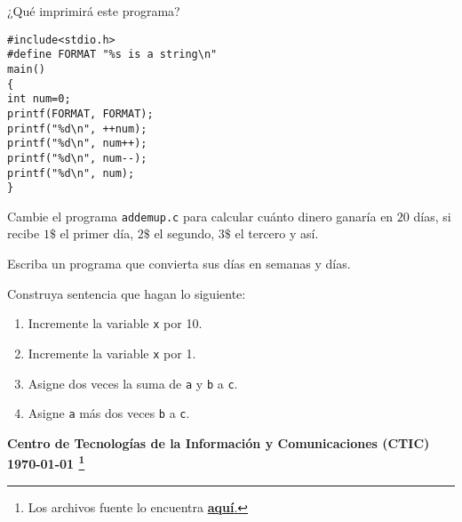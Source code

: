 \documentclass[spanish,addpoints,answers,a4paper]{exam}
\newcommand{\unmarkedfntext}[1]{%
	\begingroup
	\renewcommand\thefootnote{}\footnote{#1}%
	\addtocounter{footnote}{-1}%
	\endgroup
}
\begin{document}
\begin{questions}
\question ¿Qué imprimirá este programa?

\begin{verbatim}
#include<stdio.h>
#define FORMAT "%s is a string\n"
main()
{
int num=0;
printf(FORMAT, FORMAT);
printf("%d\n", ++num);
printf("%d\n", num++);
printf("%d\n", num--);
printf("%d\n", num);
}
\end{verbatim}

\question Cambie el programa \texttt{addemup.c} para calcular cuánto dinero ganaría en $20$ días, si recibe $1\$$ el primer día, $2\$$ el segundo, $3\$$ el tercero y así.

\question Escriba un programa que convierta sus días en semanas y días.

\question Construya sentencia que hagan lo siguiente:

\begin{enumerate}
	\item Incremente la variable \texttt{x} por 10.
	\item Incremente la variable \texttt{x} por 1.
	\item Asigne dos veces la suma de \texttt{a} y \texttt{b} a \texttt{c}.
	\item Asigne \texttt{a} más dos veces \texttt{b} a \texttt{c}.
\end{enumerate}

\end{questions}
\begin{flushright}\bfseries
Centro de Tecnologías de la Información y Comunicaciones (CTIC)\\[2mm]
\today\unmarkedfntext{Los archivos fuente lo encuentra  \href{https://github.com/carlosal1015/C-Programming}{\textbf{aquí}.}}
\end{flushright}
\end{document}
